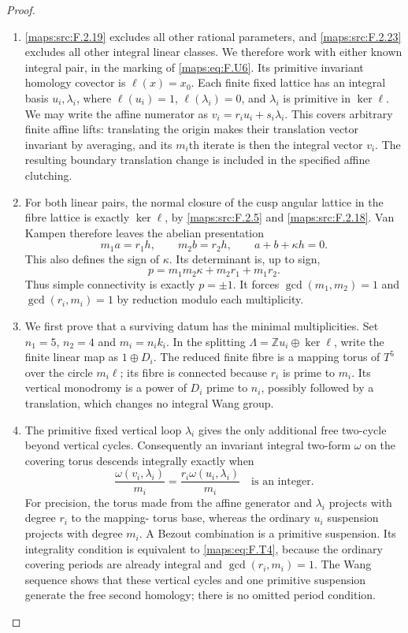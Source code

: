 \begin{proof}
\begin{enumerate}[label=\arabic*.]
\item \ref{maps:src:F.2.19} excludes all other rational parameters, and \ref{maps:src:F.2.23}
excludes all other integral linear classes.
We therefore work with either known integral pair, in the
marking of \eqref{maps:eq:F.U6}.  Its primitive invariant homology
covector is $\ell(x)=x_0$.
Each finite fixed lattice has an integral basis
$u_i,\lambda_i$, where $\ell(u_i)=1$,
$\ell(\lambda_i)=0$, and $\lambda_i$ is primitive in
$\ker\ell$.
We may write the affine numerator as
$v_i=r_i u_i+s_i\lambda_i$.
This covers arbitrary finite affine lifts: translating the
origin makes their translation vector invariant by averaging,
and its $m_i$th iterate is then the integral vector $v_i$.
The resulting boundary translation change is included in the
specified affine clutching.

\item For both linear pairs, the normal closure of the cusp angular
lattice in the fibre lattice is exactly $\ker\ell$, by
\ref{maps:src:F.2.5} and \ref{maps:src:F.2.18}.  Van Kampen therefore leaves the abelian
presentation
\[
 m_1a=r_1h,\qquad m_2b=r_2h,\qquad
 a+b+\kappa h=0.
 \tag{F.T2}\label{maps:eq:F.T2}
\]
This also defines the sign of $\kappa$.
Its determinant is, up to sign,
\[
 p=m_1m_2\kappa+m_2r_1+m_1r_2.
 \tag{F.T3}\label{maps:eq:F.T3}
\]
Thus simple connectivity is exactly $p=\pm1$.
It forces $\gcd(m_1,m_2)=1$ and
$\gcd(r_i,m_i)=1$ by reduction modulo each multiplicity.

\item We first prove that a surviving datum has the minimal
multiplicities.  Set $n_1=5$, $n_2=4$ and $m_i=n_i k_i$.
In the splitting $\Lambda=\mathbb Zu_i\oplus\ker\ell$,
write the finite linear map as $1\oplus D_i$.
The reduced finite fibre is a mapping torus of $T^5$ over
the circle $m_i\ell$; its fibre is connected because
$r_i$ is prime to $m_i$.
Its vertical monodromy is a power of $D_i$ prime to $n_i$,
possibly followed by a translation, which changes no
integral Wang group.

\item The primitive fixed vertical loop $\lambda_i$ gives the
only additional free two-cycle beyond vertical cycles.
Consequently an invariant integral two-form $\omega$ on
the covering torus descends integrally exactly when
\[
 \frac{\omega(v_i,\lambda_i)}{m_i}
       =\frac{r_i\omega(u_i,\lambda_i)}{m_i}
       \quad\text{is an integer}.
 \tag{F.T4}\label{maps:eq:F.T4}
\]
For precision, the torus made from the affine generator
and $\lambda_i$ projects with degree $r_i$ to the mapping-
torus base, whereas the ordinary $u_i$ suspension projects
with degree $m_i$.  A Bezout combination is a primitive
suspension.  Its integrality condition is equivalent to
\eqref{maps:eq:F.T4}, because the ordinary covering periods are already
integral and $\gcd(r_i,m_i)=1$.
The Wang sequence shows that these vertical cycles and one
primitive suspension generate the free second homology;
there is no omitted period condition.


\end{enumerate}
\end{proof}
